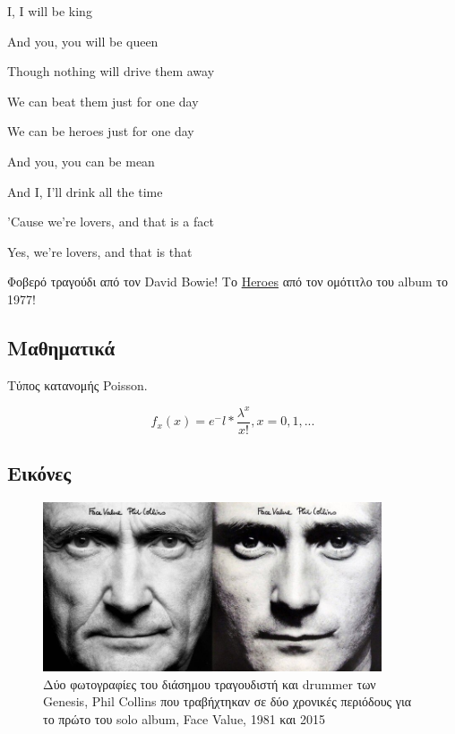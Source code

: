\begin{problem}
I, I will be king \par
And you, you will be queen \par
Though nothing will drive them away \par
We can beat them just for one day \par
We can be heroes just for one day \par
\par
And you, you can be mean \par
And I, I'll drink all the time \par
'Cause we're lovers, and that is a fact \par
Yes, we're lovers, and that is that \par
\end{problem}

Φοβερό τραγούδι από τον David Bowie! Το \href{https://www.youtube.com/watch?v=YLp2cW7ICCU}{Heroes} από τον ομότιτλο του album το 1977!

\subsection{Μαθηματικά}

Τύπος κατανομής Poisson.

\begin{equation}
  f_x(x) = e^-l * \frac{\lambda^x}{x!}, x = 0, 1, ...
\end{equation}

\subsection{Εικόνες}

\begin{figure}[H] %
  \centering %
  \includegraphics[width=100mm]{Figures/face_value} %
  \caption[Phil Collins - Face Value]{Δύο φωτογραφίες του διάσημου τραγουδιστή και drummer των Genesis, Phil Collins που τραβήχτηκαν σε δύο χρονικές περιόδους για το πρώτο του solo album, Face Value, 1981 και 2015}
  \label{fig:collins} %
\end{figure}

